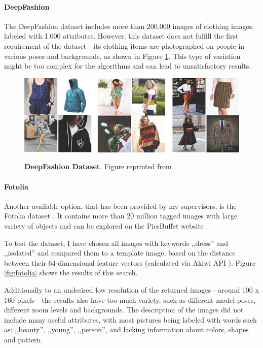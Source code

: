 \documentclass[12pt]{report}
\begin{document}
\paragraph{DeepFashion}
The DeepFashion dataset \cite{liu2016deepfashion} includes more than 200.000 images of clothing images, labeled with 1.000 attributes. However, this dataset does not fulfill the first requirement of the dataset - its clothing items are photographed on people in various poses and backgrounds, as shown in Figure \ref{fig:deepfashion}. This type of variation might be too complex for the algorithms and can lead to unsatisfactory results.

\begin{figure}[h]
\centering
{\includegraphics[width=\linewidth]{03_analysis/data/deepfashion}}
\caption{\label{fig:deepfashion} \textbf{DeepFashion Dataset}. Figure reprinted from \cite{liu2016deepfashion}.}
\end{figure}

\paragraph{Fotolia}
Another available option, that has been provided by my supervisors, is the Fotolia  dataset \cite{noauthor_fotolia_nodate}. It contains more than 20 million tagged images with large variety of objects and can be explored on the PicsBuffet website \cite{mackowiak_picsbuffet_nodate}.

To test the dataset, I have chosen all images with keywords ,,dress'' and ,,isolated'' and compared them to a template image, based on the distance between their 64-dimensional feature vectors (calculated via Akiwi API \cite{sonnenberg_akiwi_nodate}). Figure \ref{fig:fotolia} shows the results of this search. 

Additionally to an undesired low resolution of the returned images - around 100 x 160 pixels - the results also have too much variety, such as different model poses, different zoom levels and backgrounds. The description of the images did not include many useful attributes, with most pictures being labeled with words such as: ,,beauty'', ,,young'', ,,person'', and lacking information about colors, shapes and pattern.
\end{document}

